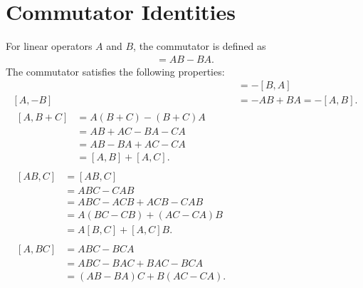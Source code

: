 \section{Commutator Identities}
For linear operators $A$ and $B$, the commutator is defined as
\begin{align}
    [A,B] = AB - BA.
\end{align}
The commutator satisfies the following properties:
\begin{align}
    [A,B] &= -[B,A] \label{eq:BA} \\
    [A,-B] &= -AB + BA = -[A,B].\label{eq:AmB} \\
    \begin{split}        
    [A,B+C] 
        &= A(B+C) - (B+C)A \\
        &= AB + AC - BA - CA \\
        &= AB - BA + AC - CA \\
        &= [A,B] + [A,C]. \label{eq:ABpC}
    \end{split}\\
    \begin{split}    
    [AB,C] 
        &= [AB,C] \\
        &= ABC - CAB \\
        &= ABC - ACB + ACB - CAB \\
        &= A(BC-CB) + (AC-CA)B \\
        &= A[B,C] + [A,C]B.\label{eq:A2B}
    \end{split}\\
    \begin{split}    
    [A,BC]
        &= ABC - BCA \\
        &= ABC - BAC + BAC - BCA \\
        &= (AB - BA)C + B(AC - CA).\label{eq:ABC}
    \end{split}
\end{align}

